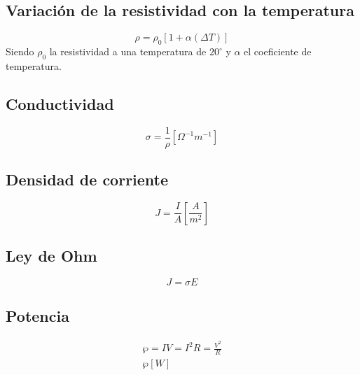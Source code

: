 \documentclass{report}
\begin{document}
    \subsection*{Variación de la resistividad con la temperatura}
      
      \begin{equation*}
        \rho=\rho_0[1+\alpha(\Delta T)]
      \end{equation*}
      \indent Siendo $\rho_0$ la resistividad a una temperatura de $20^{\circ}$ y $\alpha$
      el coeficiente de temperatura.

    \subsection*{Conductividad}

      \begin{equation*}
        \sigma=\frac{1}{\rho}[\Omega^{-1}m^{-1}]
      \end{equation*}

    \subsection*{Densidad de corriente}

      \begin{equation*}
        J=\frac{I}{A}\left[\frac{A}{m^2}\right]
      \end{equation*}

    \subsection*{Ley de Ohm}

      \begin{equation*}
        J=\sigma E
      \end{equation*}

    \subsection*{Potencia}

      \begin{align*}
        \wp=IV=I^2R=\frac{V^2}{R}\\
        \wp[W]
      \end{align*}
\end{document}

